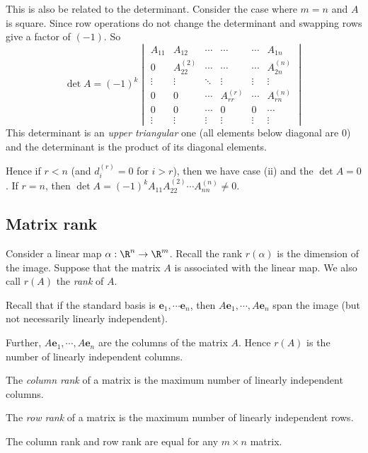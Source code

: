 \documentclass[a4paper]{article}
\begin{document}
This is also be related to the determinant. Consider the case where $m = n$ and $A$ is square. Since row operations do not change the determinant and swapping rows give a factor of $(-1)$. So
\[
  \det A = (-1)^k
  \begin{vmatrix}
    A_{11} &A_{12}&\cdots& \cdots& \cdots & A_{1n}\\
    0 & A_{22}^{(2)} &\cdots& \cdots & \cdots & A_{2n}^{(n)} \\
    \vdots & \vdots &\ddots & \vdots & \vdots & \vdots\\
    0 & 0 & \cdots & A_{rr}^{(r)} & \cdots & A_{rn}^{(n)}\\
    0 & 0 & \cdots & 0 & 0 & \cdots\\
    \vdots & \vdots & \vdots & \vdots & \vdots & \vdots
  \end{vmatrix}
\]
This determinant is an \emph{upper triangular} one (all elements below diagonal are $0$) and the determinant is the product of its diagonal elements.

Hence if $r < n$ (and $d_i^{(r)} = 0$ for $i > r$), then we have case (ii) and the $\det A = 0$. If $r = n$, then $\det A = (-1)^k A_{11}A_{22}^{(2)}\cdots A_{nn}^{(n)} \not= 0$.

\subsection{Matrix rank}
Consider a linear map $\alpha: \R^n\to \R^m$. Recall the rank $r(\alpha)$ is the dimension of the image. Suppose that the matrix $A$ is associated with the linear map. We also call $r(A)$ the \emph{rank} of $A$.

Recall that if the standard basis is $\mathbf{e}_1,\cdots \mathbf{e}_n$, then $A\mathbf{e}_1, \cdots, A\mathbf{e}_n$ span the image (but not necessarily linearly independent).

Further, $A\mathbf{e}_1, \cdots, A\mathbf{e}_n$ are the columns of the matrix $A$. Hence $r(A)$ is the number of linearly independent columns.

\begin{defi}
  The \emph{column rank} of a matrix is the maximum number of linearly independent columns.

  The \emph{row rank} of a matrix is the maximum number of linearly independent rows.
\end{defi}

\begin{thm}
  The column rank and row rank are equal for any $m\times n$ matrix.
\end{thm}
\end{document}
